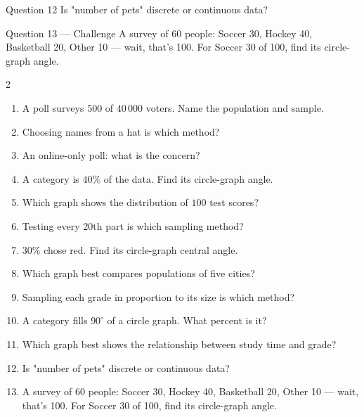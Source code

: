 \documentclass[11pt]{article}
\begin{document}
\begin{qbox}{Question 12}
Is "number of pets" discrete or continuous data?\workspace{2.4cm}
\end{qbox}

\begin{qbox}{Question 13 --- Challenge}
A survey of $60$ people: Soccer 30, Hockey 40, Basketball 20, Other 10 — wait, that's 100. For Soccer 30 of 100, find its circle-graph angle.\workspace{2.6cm}
\end{qbox}

\clearpage
{}

\begin{recapbox}
\begin{multicols}{2}
\small
\begin{enumerate}[leftmargin=*,itemsep=3pt]
  \item A poll surveys $500$ of $40\,000$ voters. Name the population and sample.
  \item Choosing names from a hat is which method?
  \item An online-only poll: what is the concern?
  \item A category is $40\%$ of the data. Find its circle-graph angle.
  \item Which graph shows the distribution of $100$ test scores?
  \item Testing every $20$th part is which sampling method?
  \item $30\%$ chose red. Find its circle-graph central angle.
  \item Which graph best compares populations of five cities?
  \item Sampling each grade in proportion to its size is which method?
  \item A category fills $90^\circ$ of a circle graph. What percent is it?
  \item Which graph best shows the relationship between study time and grade?
  \item Is "number of pets" discrete or continuous data?
  \item A survey of $60$ people: Soccer 30, Hockey 40, Basketball 20, Other 10 — wait, that's 100. For Soccer 30 of 100, find its circle-graph angle.
\end{enumerate}
\end{multicols}
\end{recapbox}
\end{document}
